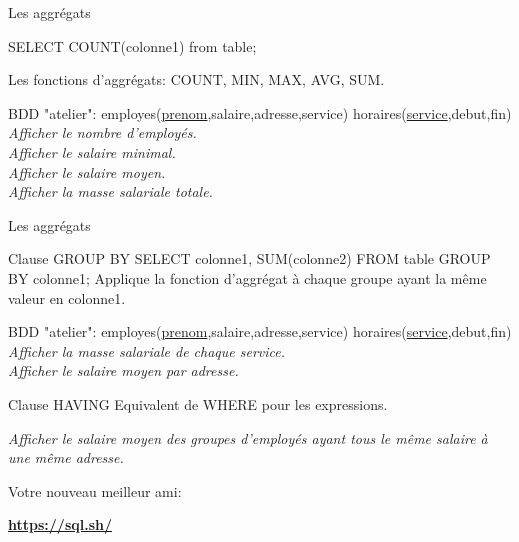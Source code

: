 \documentclass[xetex,dvipsnames]{beamer}
\begin{document}
\begin{frame}[t]{Les aggrégats}

	\begin{alertblock}{}
	SELECT COUNT(colonne1) from table;
	\end{alertblock}
	\begin{block}{Les fonctions d'aggrégats:}
		COUNT, MIN, MAX, AVG, SUM.	
	\end{block}

\begin{scriptsize}
		\vspace{1em}
		BDD "atelier": employes(\underline{prenom},salaire,adresse,service) horaires(\underline{service},debut,fin)\\
		\vspace{0.5em}
	\textit{Afficher le nombre d'employés.}\\
	\textit{Afficher le salaire minimal.}\\
	\textit{Afficher le salaire moyen.}\\
	\textit{Afficher la masse salariale totale.}\\

\end{scriptsize}
\end{frame}

\begin{frame}[t]{Les aggrégats}
	\begin{alertblock}{Clause GROUP BY}
	SELECT colonne1, SUM(colonne2) FROM table GROUP BY colonne1;
	Applique la fonction d'aggrégat à chaque groupe ayant la même valeur en colonne1.
	\end{alertblock}
	
\begin{scriptsize}
	\vspace{1em}
	BDD "atelier": employes(\underline{prenom},salaire,adresse,service) horaires(\underline{service},debut,fin)\\
	\vspace{0.5em}
	\textit{Afficher la masse salariale de chaque service.}\\
	\textit{Afficher le salaire moyen par adresse.}\\
\end{scriptsize}
	
	\begin{alertblock}{Clause HAVING}
	Equivalent de WHERE pour les expressions.
	\end{alertblock}
\begin{scriptsize}	\textit{Afficher le salaire moyen des groupes d'employés ayant tous le même salaire à une même adresse.}\\\end{scriptsize}
\end{frame}


\begin{frame}{Votre nouveau meilleur ami:}
\begin{large}
\begin{center}
	\href{https://sql.sh/}{\textbf{https://sql.sh/}}
\end{center}\end{large}
\end{frame}
\end{document}
